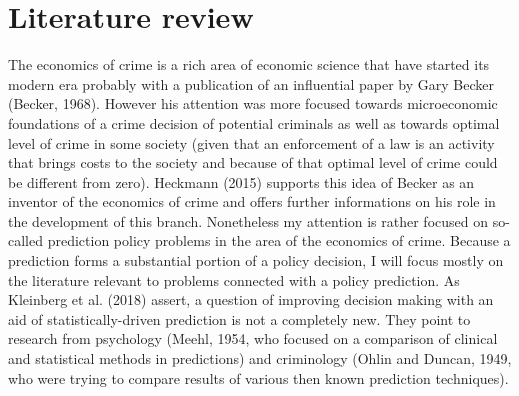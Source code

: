 \documentclass[12pt, twoside]{book} %
\begin{document}
\section{Literature review}     %
The economics of crime is a rich area of economic science that have started its modern era probably with a publication of an influential paper by Gary Becker (Becker, 1968). However his attention was more focused towards microeconomic foundations of a crime decision of potential criminals as well as towards optimal level of crime in some society (given that an enforcement of a law is an activity that brings costs to the society and because of that optimal level of crime could be different from zero). Heckmann (2015) supports this idea of Becker as an inventor of the economics of crime and offers further informations on his role in the development of this branch.\newline
Nonetheless my attention is rather focused on so-called prediction policy problems in the area of the economics of crime. Because a prediction forms a substantial portion of a policy decision, I will focus mostly on the literature relevant to problems connected with a policy prediction. As Kleinberg et al. (2018) assert, a question of improving decision making with an aid of statistically-driven prediction is not a completely new. They point to research from psychology (Meehl, 1954, who focused on a comparison of clinical and statistical methods in predictions) and criminology (Ohlin and Duncan, 1949, who were trying to compare results of various then known prediction techniques). \newline
\end{document}
